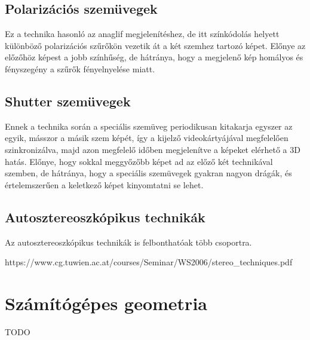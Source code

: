 \documentclass[12pt]{article}
\theoremstyle{plain}
\begin{document}
\subsection{Polarizációs szemüvegek}

Ez a technika hasonló az anaglif megjelenítéshez, de itt színkódolás helyett különböző polarizációs szűrőkön vezetik át a két szemhez tartozó képet. Előnye az előzőhöz képest a jobb színhűség, de hátránya, hogy a megjelenő kép homályos és fényszegény a szűrők fényelnyelése miatt.

\subsection{Shutter szemüvegek}

Ennek a technika során a speciális szemüveg periodikusan kitakarja egyszer az egyik, másszor a másik szem képét, így a kijelző videokártyájával megfelelően szinkronizálva, majd azon megfelelő időben megjelenítve a képeket elérhető a 3D hatás. Előnye, hogy sokkal meggyőzőbb képet ad az előző két technikával szemben, de hátránya, hogy a speciális szemüvegek gyakran nagyon drágák, és értelemszerűen a keletkező képet kinyomtatni se lehet. \newline
\subsection{Autosztereoszkópikus technikák}
Az autosztereoszkópikus technikák is felbonthatóak több csoportra. 
 
https://www.cg.tuwien.ac.at/courses/Seminar/WS2006/stereo_techniques.pdf

\section{Számítógépes geometria}
TODO




\end{document}
